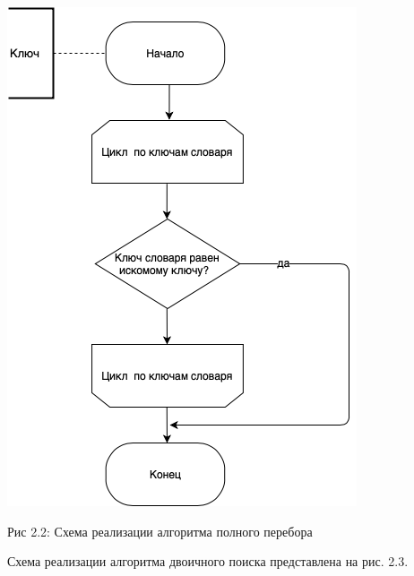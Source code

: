 \documentclass[12pt]{report}
\begin{document}
\begin{center}
		\includegraphics[scale=0.6]{schema/Brute.png}
		
			Рис 2.2: Схема реализации алгоритма полного перебора
\end{center}

Схема реализации алгоритма двоичного поиска представлена на рис. 2.3.
\end{document}

